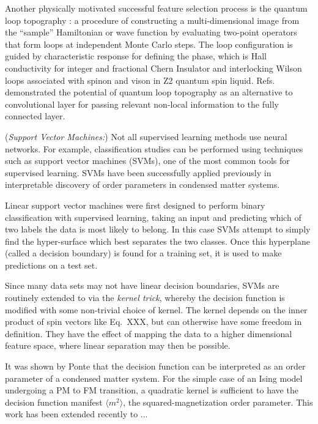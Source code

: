 \documentclass[aps,prb,floatfix,amsmath,amssymb,amsfonts,10pt,floatfix,longbibliography]{revtex4-1}
\begin{document}
Another physically motivated successful feature selection process is the quantum loop topography \cite{Zhang2017a,Zhang2017}: a procedure of constructing a multi-dimensional image from the ``sample'' Hamiltonian or wave function by evaluating two-point operators that form loops at independent Monte Carlo steps.
The loop configuration is guided by characteristic response for defining the phase, which is Hall conductivity for integer and fractional Chern Insulator\cite{Zhang2017a} and 
interlocking Wilson loops associated with spinon and vison in Z2 quantum spin liquid\cite{Zhang2017}. 
Refs.~\cite{Zhang2017a,Zhang2017} demonstrated the potential of quantum loop topography as an alternative to convolutional layer for passing relevant non-local information to the fully connected layer. 
  


({\it Support Vector Machines:})
Not all supervised learning methods use neural networks.  For example, classification studies can be performed using techniques such as support vector machines (SVMs), one of the most common tools for supervised learning.  SVMs have been successfully applied previously in interpretable discovery of order parameters in condensed matter systems.  

Linear support vector machines were first designed to perform binary classification with supervised learning, taking an input and predicting which of two labels the data is most likely to belong.  In this case SVMs attempt to simply find the hyper-surface which best separates the two classes.  Once this hyperplane (called a decision boundary) is found for a training set, it is used to make predictions on a test set.

Since many data sets may not have linear decision boundaries, SVMs are routinely extended to via the {\it kernel trick}, whereby the decision function is modified with some non-trivial choice of kernel.  
The kernel depends on the inner product of spin vectors like Eq.~XXX, but can otherwise have some freedom in definition.
They have the effect of mapping the data to a higher dimensional feature space, where linear separation may then be possible.   

It was shown by Ponte that the decision function can be interpreted as an order parameter of a condensed matter system.  For the simple case of an Ising model undergoing a PM to FM transition, a quadratic kernel is sufficient to have the decision function manifest $\langle m^2 \rangle$, the squared-magnetization order parameter.  This work has been extended recently to ...
\end{document}
